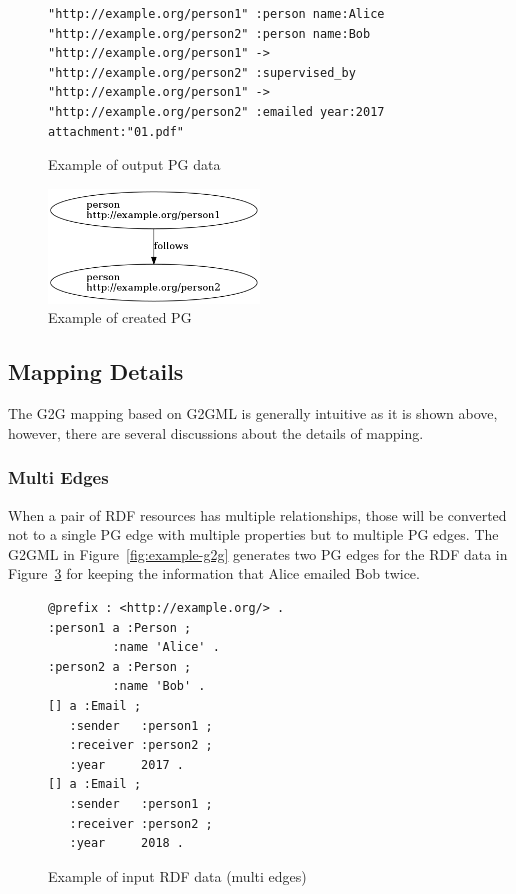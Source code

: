 \documentclass[runningheads]{llncs}
\begin{document}
\begin{figure}[!t]
\begin{scriptsize}
\begin{verbatim}
"http://example.org/person1" :person name:Alice
"http://example.org/person2" :person name:Bob
"http://example.org/person1" -> "http://example.org/person2" :supervised_by
"http://example.org/person1" -> "http://example.org/person2" :emailed year:2017 attachment:"01.pdf"
\end{verbatim}
\end{scriptsize}
\caption{Example of output PG data}
\label{fig:example-pg}
\end{figure}


\begin{figure}
\center
\includegraphics[width=0.5\textwidth]{pg_example5.png}
\caption{Example of created PG}
\label{fig:pg_example5}
\end{figure}


\subsection{Mapping Details}
The G2G mapping based on G2GML is generally intuitive as it is shown above, however, there are several discussions about the details of mapping.


\subsubsection{Multi Edges}
When a pair of RDF resources has multiple relationships, those will be converted not to a single PG edge with multiple properties but to multiple PG edges. The G2GML in Figure~\ref{fig:example-g2g} generates two PG edges for the RDF data in Figure~\ref{fig:example-rdf2} for keeping the information that Alice emailed Bob twice.


\begin{figure}[!t]
\begin{scriptsize}
\begin{verbatim}
@prefix : <http://example.org/> .
:person1 a :Person ;
         :name 'Alice' .
:person2 a :Person ;
         :name 'Bob' .
[] a :Email ;
   :sender   :person1 ;
   :receiver :person2 ;
   :year     2017 .
[] a :Email ;
   :sender   :person1 ;
   :receiver :person2 ;
   :year     2018 .
\end{verbatim}
\end{scriptsize}
\caption{Example of input RDF data (multi edges)}
\label{fig:example-rdf2}
\end{figure}
\end{document}
